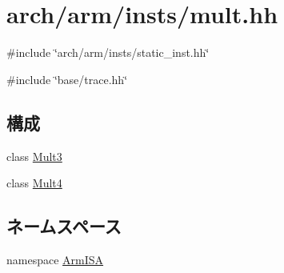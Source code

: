 \hypertarget{mult_8hh}{
\section{arch/arm/insts/mult.hh}
\label{mult_8hh}
}
{\ttfamily \#include \char`\"{}arch/arm/insts/static\_\-inst.hh\char`\"{}}\par
{\ttfamily \#include \char`\"{}base/trace.hh\char`\"{}}\par
\subsection*{構成}
\begin{DoxyCompactItemize}
\item 
class \hyperlink{classArmISA_1_1Mult3}{Mult3}
\item 
class \hyperlink{classArmISA_1_1Mult4}{Mult4}
\end{DoxyCompactItemize}
\subsection*{ネームスペース}
\begin{DoxyCompactItemize}
\item 
namespace \hyperlink{namespaceArmISA}{ArmISA}
\end{DoxyCompactItemize}
